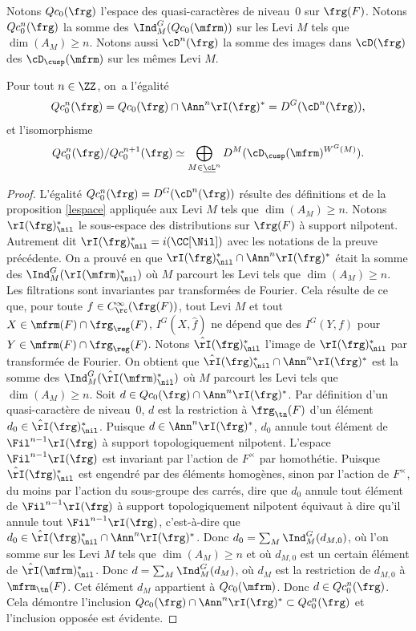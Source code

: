 Notons $Qc_{0}(\frg)$ l'espace des quasi-caractères de niveau~$0$ sur $\frg(F)$. Notons $Qc_{0}^n(\frg)$ la somme des $\Ind_{M}^G(Qc_{0}(\mfrm))$ sur les Levi $M$ tels que $\dim(A_{M})\geq n$. Notons aussi $\cD^n(\frg)$ la somme des images dans $\cD(\frg)$ des $\cD_{\cusp}(\mfrm)$ sur les mêmes Levi $M$.

\begin{lem*}
Pour tout $n\in \ZZ$, on~a l'égalité
\[
Qc_{0}^n(\frg)=Qc_{0}(\frg)\cap \Ann^n\rI(\frg)^*=D^G(\cD^n(\frg)),
\]
et l'isomorphisme
\[
Qc_{0}^n(\frg)/Qc_{0}^{n+1}(\frg)\simeq \bigoplus_{M\in \underline{\cL}^n}D^M(\cD_{\cusp}(\mfrm)^{W^G(M)}).
\]
\end{lem*}

\begin{proof}
L'égalité $Qc_{0}^n(\frg)=D^G(\cD^n(\frg))$ résulte des définitions et de la proposition \ref{lespace} appliquée aux Levi $M$ tels que $\dim(A_{M})\geq n$. Notons $\rI(\frg)^*_{\nil}$ le sous-espace des distributions sur $\frg(F)$ à support nilpotent. Autrement dit $\rI(\frg)^*_{\nil}=i(\CC[\Nil])$ avec les notations de la preuve précédente. On a prouvé en \cite[Prop.\,I.5.3]{MW} que $\rI(\frg)^*_{\nil}\cap \Ann^n\rI(\frg)^*$ était la somme des $\Ind_{M}^G(\rI(\mfrm)^*_{\nil})$ où $M$ parcourt les Levi tels que $\dim(A_{M})\geq n$. Les filtrations sont invariantes par transformées de Fourier. Cela résulte de ce que, pour toute $f\in C_{\rc}^{\infty}(\frg(F))$, tout Levi $M$ et tout $X\in \mfrm(F)\cap \frg_{\reg}(F)$, $I^G(X,\hat{f})$ ne dépend que des $I^G(Y,f)$ pour $Y\in \mfrm(F)\cap \frg_{\reg}(F)$. Notons $\hat{\rI}(\frg)^*_{\nil}$ l'image de $\rI(\frg)^*_{\nil}$ par transformée de Fourier. On obtient que $\hat{\rI}(\frg)^*_{\nil}\cap \Ann^n\rI(\frg)^*$ est la somme des $\Ind_{M}^G(\hat{\rI}(\mfrm)^*_{\nil})$ où $M$ parcourt les Levi tels que $\dim(A_{M})\geq n$. Soit $d\in Qc_{0}(\frg)\cap \Ann^n\rI(\frg)^* $. Par définition d'un quasi-caractère de niveau~$0$, $d$ est la restriction à $\frg_{\tn}(F)$ d'un élément $d_{0}\in \hat{\rI}(\frg)^*_{\nil}$. Puisque $d\in \Ann^n\rI(\frg)^*$, $d_{0}$ annule tout élément de $\Fil^{n-1}\rI(\frg)$ à support topologiquement nilpotent. L'espace $\Fil^{n-1}\rI(\frg)$ est invariant par l'action de $F^{\times}$ par homothétie. Puisque $\hat{\rI}(\frg)^*_{\nil}$ est engendré par des éléments homogènes, sinon par l'action de $F^{\times}$, du moins par l'action du sous-groupe des carrés, dire que $d_{0}$ annule tout élément de $\Fil^{n-1}\rI(\frg)$ à support topologiquement nilpotent équivaut à dire qu'il annule tout $\Fil^{n-1}\rI(\frg)$, c'est-à-dire que $d_{0}\in \hat{\rI}(\frg)^*_{\nil}\cap \Ann^n\rI(\frg)^*$. Donc $d_{0}=\sum_{M}\Ind_{M}^G(d_{M,0})$, où l'on somme sur les Levi $M$ tels que $\dim(A_{M})\geq n$ et où $d_{M,0}$ est un certain élément de $\hat{\rI}(\mfrm)^*_{\nil}$. Donc $d= \sum_{M}\Ind_{M}^G(d_{M})$, où $d_{M}$ est la restriction de $d_{M,0}$ à $\mfrm_{\tn}(F)$. Cet élément $d_{M}$ appartient à $Qc_{0}(\mfrm)$. Donc $d\in Qc_{0}^n(\frg)$. Cela démontre l'inclusion $Qc_{0}(\frg)\cap \Ann^n\rI(\frg)^*\subset Qc_{0}^n(\frg)$ et l'inclusion opposée est évidente.


\end{proof}
